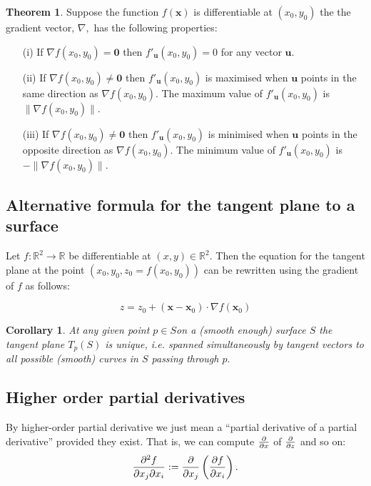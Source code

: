 \documentclass[12pt, a4paper]{article}
\newcommand{\bb}[1]{\mathbb{#1}}
\newcommand{\mb}[1]{\mathbf{#1}}
\theoremstyle{definition}
\newtheorem{theorem}{Theorem}[section]
\theoremstyle{plain}
\newtheorem{corollary}{Corollary}[theorem]
\begin{document}
\begin{theorem}
Suppose the function $f(\mb{x})$ is differentiable at $(x_0,y_0)$ the the gradient vector, $\nabla,$ has the following properties: \begin{enumerate}
	
	\item[(i)] If $\nabla f(x_0,y_0)=\mb{0}$ then $f'_{\mb{u}}(x_0,y_0)=0$ for any vector $\mb{u}.$

	\item[(ii)] If $\nabla f(x_0,y_0)\neq\mb{0}$ then $f'_{\mb{u}}(x_0,y_0)$ is maximised when $\mb{u}$ points in the same direction as $\nabla f(x_0,y_0)$. The maximum value of $f'_{\mb{u}}(x_0,y_0)$ is $\|\nabla f(x_0,y_0)\|.$

	\item[(iii)] If $\nabla f(x_0,y_0)\neq\mb{0}$ then $f'_{\mb{u}}(x_0,y_0)$ is minimised when $\mb{u}$ points in the opposite direction as $\nabla f(x_0,y_0)$. The minimum value of $f'_{\mb{u}}(x_0,y_0)$ is $-\|\nabla f(x_0,y_0)\|.$

\end{enumerate}
\end{theorem} 

\subsection{Alternative formula for the tangent plane to a surface}

Let $f : \bb{R}^2 \to \bb{R}$ be differentiable at $(x, y) \in \bb{R}^2.$ Then the equation for the tangent plane at the point $(x_0,y_0,z_0 = f(x_0,y_0))$ can be rewritten using the gradient of $f$ as follows: 

\begin{tcolorbox}
$$z=z_0+(\mathbf{x}-\mathbf{x}_0)\cdot \nabla f(\mathbf{x}_0)$$
\end{tcolorbox}

\begin{corollary}
At any given point $p \in S $on a (smooth enough) surface $S$ the tangent plane $T_p(S)$ is unique, i.e. spanned simultaneously by tangent vectors to all possible (smooth) curves in $S$ passing through $p.$
\end{corollary}

\subsection{Higher order partial derivatives}

By higher-order partial derivative we just mean a “partial derivative of a partial derivative” provided they exist. That is, we can compute $\pdv{}{x}$ of $\pdv{}{z}$ and so on: $$\pdv[2]{f}{x_j}{x_i}:=\pdv{}{x_j}\left(\pdv{f}{x_i}\right).$$
\end{document}

